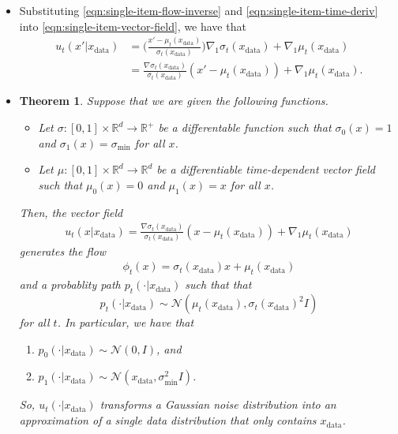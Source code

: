 \documentclass[10pt]{article}
\newtheorem{theorem}[lemma]{Theorem}
\newcommand{\ra}{\rightarrow}
\newcommand{\mcal}[1]{\mathcal{#1}}
\newcommand{\Real}{\mathbb{R}}
\newcommand{\data}{\mathrm{data}}
\begin{document}
\begin{itemize}
  \item Substituting \eqref{eqn:single-item-flow-inverse} and \eqref{eqn:single-item-time-deriv} into \eqref{eqn:single-item-vector-field}, we have that
  \begin{align*}
    u_t(x'|x_{\data}) 
    &= \bigg( \frac{x' - \mu_t(x_{\data})}{\sigma_t(x_{\data})} \bigg) \nabla_1 \sigma_t(x_{\data}) + \nabla_1 \mu_t(x_{\data}) \\
    &= \frac{\nabla \sigma_t(x_{\data})}{\sigma_t(x_{\data})}(x' - \mu_t(x_{\data})) + \nabla_1 \mu_t(x_{\data}).
  \end{align*}

  \item \begin{theorem}
    Suppose that we are given the following functions.
    \begin{itemize}
      \item Let $\sigma: [0,1] \times \Real^d \ra \Real^+$ be a differentable function such that $\sigma_0(x) = 1$ and $\sigma_1(x) = \sigma_{\min}$ for all $x$.
      \item Let $\mu: [0,1] \times \Real^d \ra \Real^d$ be a differentiable time-dependent vector field such that $\mu_0(x) = 0$ and $\mu_1(x) = x$ for all $x$.
    \end{itemize}
    Then, the vector field
    \begin{align*}
      u_t(x|x_{\data}) = \frac{\nabla \sigma_t(x_{\data})}{\sigma_t(x_{\data})}(x - \mu_t(x_{\data})) + \nabla_1 \mu_t(x_{\data})
    \end{align*}
    generates the flow
    \begin{align*}
      \phi_t(x) = \sigma_t(x_{\data}) x + \mu_t(x_{\data})
    \end{align*}
    and a probablity path $p_t(\cdot|x_{\data})$ such that that $$p_t(\cdot|x_{\data}) \sim \mcal{N}(\mu_t(x_{\data}), \sigma_t(x_{\data})^2 I)$$ for all $t$. In particular, we have that
    \begin{enumerate}
      \item $p_0(\cdot|x_{\data}) \sim \mcal{N}(0,I)$, and 
      \item $p_1(\cdot|x_{\data}) \sim \mcal{N}(x_{\data}, \sigma_{\min}^2 I)$.      
    \end{enumerate}
    So, $u_t(\cdot|x_{\data})$ transforms a Gaussian noise distribution into an approximation of a single data distribution that only contains $x_{\data}$.
  \end{theorem}
\end{itemize}
\end{document}
